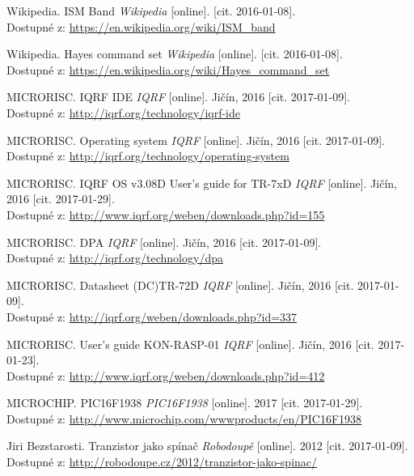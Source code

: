\documentclass[12pt,a4paper,oneside]{article}
\begin{document}
\begin{thebibliography}{99}


Wikipedia. ISM Band \emph{Wikipedia} [online]. [cit. 2016-01-08]. \\ Dostupné z: \url{https://en.wikipedia.org/wiki/ISM\_band}

Wikipedia. Hayes command set \emph{Wikipedia} [online]. [cit. 2016-01-08]. \\ Dostupné z: \url{https://en.wikipedia.org/wiki/Hayes\_command\_set}

MICRORISC. IQRF IDE \emph{IQRF} [online]. Jičín, 2016 [cit. 2017-01-09]. \\ Dostupné z: \url{http://iqrf.org/technology/iqrf-ide}

MICRORISC. Operating system \emph{IQRF} [online]. Jičín, 2016 [cit. 2017-01-09]. \\ Dostupné z: \url{http://iqrf.org/technology/operating-system}

MICRORISC. IQRF OS v3.08D User's guide for TR-7xD \emph{IQRF} [online]. Jičín, 2016 [cit. 2017-01-29]. \\ Dostupné z: \url{http://www.iqrf.org/weben/downloads.php?id=155}

MICRORISC. DPA \emph{IQRF} [online]. Jičín, 2016 [cit. 2017-01-09]. \\ Dostupné z: \url{http://iqrf.org/technology/dpa}

MICRORISC. Datasheet (DC)TR-72D \emph{IQRF} [online]. Jičín, 2016 [cit. 2017-01-09]. \\ Dostupné z: \url{http://iqrf.org/weben/downloads.php?id=337}

MICRORISC. User's guide KON-RASP-01 \emph{IQRF} [online]. Jičín, 2016 [cit. 2017-01-23]. \\ Dostupné z: \url{http://www.iqrf.org/weben/downloads.php?id=412}

MICROCHIP. PIC16F1938 \emph{PIC16F1938} [online]. 2017 [cit. 2017-01-29]. \\ Dostupné z: \url{http://www.microchip.com/wwwproducts/en/PIC16F1938}

Jiri Bezstarosti. Tranzistor jako spínač \emph{Robodoupě} [online]. 2012 [cit. 2017-01-09]. \\ Dostupné z: \url{http://robodoupe.cz/2012/tranzistor-jako-spinac/}


\end{thebibliography}
\end{document}
